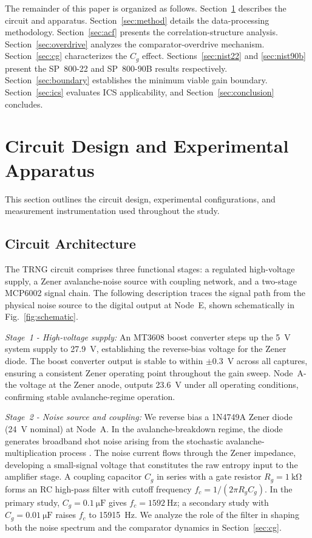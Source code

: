 \documentclass[conference]{IEEEtran}
\newcommand{\Cg}{\ensuremath{C_g}}
\newcommand{\Rg}{\ensuremath{R_g}}
\begin{document}
The remainder of this paper is organized as follows.
Section~\ref{sec:circuit} describes the circuit and apparatus.
Section~\ref{sec:method} details the data-processing methodology.
Section~\ref{sec:acf} presents the correlation-structure analysis.
Section~\ref{sec:overdrive} analyzes the comparator-overdrive mechanism.
Section~\ref{sec:cg} characterizes the $\Cg$ effect.
Sections~\ref{sec:nist22} and \ref{sec:nist90b} present the SP~800-22
and SP~800-90B results respectively. Section~\ref{sec:boundary}
establishes the minimum viable gain boundary.
Section~\ref{sec:ics} evaluates ICS applicability, and
Section~\ref{sec:conclusion} concludes.

\section{Circuit Design and Experimental Apparatus}\label{sec:circuit}
This section outlines the circuit design, experimental
configurations, and measurement instrumentation used throughout the
study.

\subsection{Circuit Architecture}

The TRNG circuit comprises three functional stages: a regulated
high-voltage supply, a Zener avalanche-noise source with coupling
network, and a two-stage MCP6002 signal chain. The following description traces the signal path from the physical
noise source to the digital output at Node~E, shown schematically in
Fig.~\ref{fig:schematic}.

\textit{Stage~1 - High-voltage supply:} An MT3608 boost converter
steps up the \SI{5}{\volt} system supply to \SI{27.9}{\volt},
establishing the reverse-bias voltage for the Zener diode. The boost
converter output is stable to within $\pm 0.3$~V across all captures,
ensuring a consistent Zener operating point throughout the gain sweep.
Node~A-the voltage at the Zener anode, outputs \SI{23.6}{\volt}
under all operating conditions, confirming stable avalanche-regime
operation.

\textit{Stage~2 - Noise source and coupling:} We reverse bias a 1N4749A Zener diode
(\SI{24}{\volt} nominal) at Node~A. In the
avalanche-breakdown regime, the diode generates broadband shot noise
arising from the stochastic avalanche-multiplication process \cite{petrie2000}. The
noise current flows through the Zener impedance, developing a
small-signal voltage that constitutes the raw entropy input to the
amplifier stage. A coupling capacitor $\Cg$ in series with a gate
resistor $\Rg=\SI{1}{\kilo\ohm}$ forms an RC high-pass filter with
cutoff frequency $f_c = 1/(2\pi \Rg \Cg)$. In the primary study,
$\Cg=\SI{0.1}{\micro\farad}$ gives $f_c=\SI{1592}{\hertz}$;
a secondary study with $\Cg=\SI{0.01}{\micro\farad}$ raises $f_c$ to
\SI{15915}{\hertz}. We analyze the role of the filter in shaping both the noise
spectrum and the comparator dynamics in
Section~\ref{sec:cg}.
\end{document}
